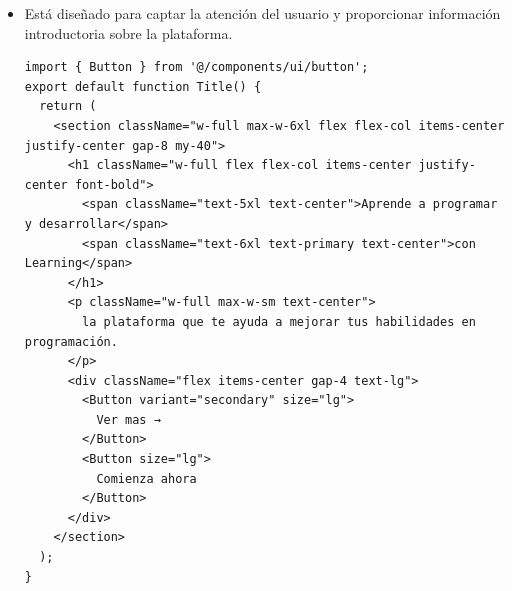 \begin{itemize}
\begin{itemize}
      \item Está diseñado para captar la atención del usuario y proporcionar información introductoria sobre la plataforma.
      \begin{verbatim}
import { Button } from '@/components/ui/button';
export default function Title() {
  return (
    <section className="w-full max-w-6xl flex flex-col items-center justify-center gap-8 my-40">
      <h1 className="w-full flex flex-col items-center justify-center font-bold">
        <span className="text-5xl text-center">Aprende a programar y desarrollar</span>
        <span className="text-6xl text-primary text-center">con Learning</span>
      </h1>
      <p className="w-full max-w-sm text-center">
        la plataforma que te ayuda a mejorar tus habilidades en programación.
      </p>
      <div className="flex items-center gap-4 text-lg">
        <Button variant="secondary" size="lg">
          Ver mas →
        </Button>
        <Button size="lg">
          Comienza ahora
        </Button>
      </div>
    </section>
  );
}
      \end{verbatim}
    \end{itemize}
  \end{itemize}


